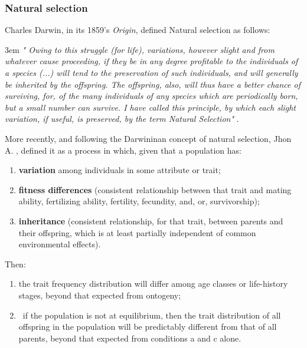 \subsubsection{Natural selection}

Charles Darwin, in its 1859's \textit{Origin}, defined Natural selection as follows:
\begin{flushleft}
\leftskip3em
\rightskip\leftskip
\footnotesize{
\textit{
" Owing to this struggle (for life), variations, however slight and from whatever cause proceeding, if they be in any degree profitable to the individuals of a species (...) will tend to the preservation of such individuals, and will generally be inherited by the offspring. The offspring, also, will thus have a better chance of surviving, for, of the many individuals of any species which are periodically born, but a small number can survive. I have called this principle,
by which each slight variation, if useful, is preserved, by the term Natural Selection"} \citep{darwin1859origin}.
}
\end{flushleft}

More recently, and following the Darwininan concept of natural selection, Jhon A. \citet{endler1986natural}, defined it as a process in which, given that a population has:

\vspace{3mm}
\begin{enumerate}[label=\textit{\alph*.}]
\item \textbf{variation} among individuals in some attribute or trait;
\item \textbf{fitness differences} (consistent relationship between that trait and mating ability, fertilizing ability, fertility, fecundity, and, or, survivorship);
\item  \textbf{inheritance} (consistent relationship, for that trait, between parents and their offspring, which is at least partially independent of common environmental effects).
\end{enumerate}
\vspace{3mm}
Then:
\vspace{3mm}
\begin{enumerate}
\item the trait frequency distribution will differ among age classes or life-history stages, beyond that expected from ontogeny;
\item\ if the population is not at equilibrium, then the trait distribution of all offspring in the population will be predictably different from that of all parents, beyond that expected
from conditions a and c alone.
\end{enumerate}
\vspace{3mm}

